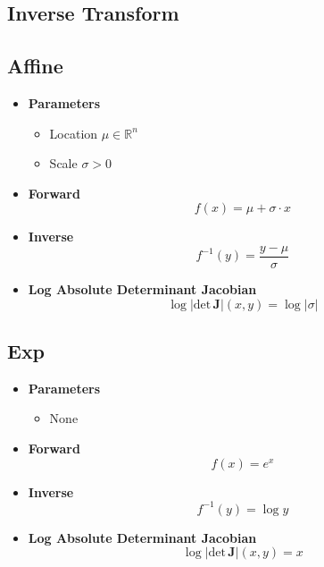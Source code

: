 \documentclass{article}
\begin{document}
\subsection{Inverse Transform}
\subsection{Affine}
\begin{itemize}
  \item \textbf{Parameters}
  \begin{itemize}
    \item Location $\mu \in \mathbb{R}^n$
    \item Scale $\sigma > 0$
  \end{itemize}
  \item \textbf{Forward}
  \begin{equation}
    f(x) = \mu + \sigma \cdot x
  \end{equation}
  \item \textbf{Inverse}
  \begin{equation}
    f^{-1}(y) = \frac{y - \mu}{\sigma}
  \end{equation}
  \item \textbf{Log Absolute Determinant Jacobian}
  \begin{equation}
    \log \vert \text{det} \, \mathbf{J} \vert (x, y) = \log \vert \sigma \vert
  \end{equation}
\end{itemize}
\subsection{Exp}
\begin{itemize}
  \item \textbf{Parameters}
  \begin{itemize}
    \item None
  \end{itemize}
  \item \textbf{Forward}
  \begin{equation}
    f(x) = e^x
  \end{equation}
  \item \textbf{Inverse}
  \begin{equation}
    f^{-1}(y) = \log y
  \end{equation}
  \item \textbf{Log Absolute Determinant Jacobian}
  \begin{equation}
    \log \vert \text{det} \, \mathbf{J} \vert (x, y) = x
  \end{equation}
\end{itemize}
\end{document}
